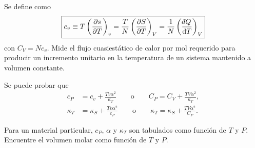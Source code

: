 Se define como
\begin{equation*}
  \boxed{c_v\equiv T\pdvc{s}{T}{v}=\frac{T}{N}\pdvc{S}{T}{V}=\frac{1}{N}\left(\frac{\dbar Q}{\dd T}\right)_{V}}
\end{equation*}
con $C_V=Nc_v$. %
Mide el flujo cuasiestático de calor por mol requerido para producir un incremento unitario en la
temperatura de un sistema mantenido a volumen constante.

\begin{proposicion}
  Se puede probar que
  \begin{align*}
    c_P&=c_v+\frac{Tv\alpha^{2}}{\kappa_T}\qquad\text{o}\qquad C_P=C_V+\frac{TV\alpha^{2}}{\kappa_T},\\
    \kappa_T&=\kappa_S+\frac{Tv\alpha^{2}}{c_P}\qquad\text{o}\qquad\kappa_T=\kappa_S+\frac{TV\alpha^{2}}{C_P}.
  \end{align*}
\end{proposicion}

\begin{ejercicio}
  Para un material particular, $c_P$, $\alpha$ y $\kappa_T$ son tabulados como función de $T$ y $P$.
  Encuentre el volumen molar como función de $T$ y $P$.
\end{ejercicio}

